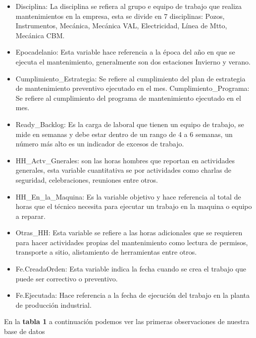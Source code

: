 \documentclass[
  11pt,
  bookmarksnumbered]{article}
\begin{document}
\begin{itemize}
\item
  Disciplina: La disciplina se refiera al grupo e equipo de trabajo que realiza mantenimientos en la empresa, esta se divide en 7 disciplinas: Pozos, Instrumentos, Mecánica, Mecánica VAL, Electricidad, Línea de Mtto, Mecánica CBM.
\item
  Epocadelanio: Esta variable hace referencia a la época del año en que se ejecuta el mantenimiento, generalmente son dos estaciones Invierno y verano.
\item
  Cumplimiento\_Estrategia: Se refiere al cumplimiento del plan de estrategia de mantenimiento preventivo ejecutado en el mes.
  Cumplimiento\_Programa: Se refiere al cumplimiento del programa de mantenimiento ejecutado en el mes.
\item
  Ready\_Backlog: Es la carga de laboral que tienen un equipo de trabajo, se mide en semanas y debe estar dentro de un rango de 4 a 6 semanas, un número más alto es un indicador de excesos de trabajo.
\item
  HH\_Actv\_Gnerales: son las horas hombres que reportan en actividades generales, esta variable cuantitativa se por actividades como charlas de seguridad, celebraciones, reuniones entre otros.
\item
  HH\_En\_la\_Maquina: Es la variable objetivo y hace referencia al total de horas que el técnico necesita para ejecutar un trabajo en la maquina o equipo a reparar.
\item
  Otras\_HH: Esta variable se refiere a las horas adicionales que se requieren para hacer actividades propias del mantenimiento como lectura de permisos, transporte a sitio, alistamiento de herramientas entre otros.
\item
  Fe.CreadaOrden: Esta variable indica la fecha cuando se crea el trabajo que puede ser correctivo o preventivo.
\item
  Fe.Ejecutada: Hace referencia a la fecha de ejecución del trabajo en la planta de producción industrial.
\end{itemize}

\vspace{0.2cm}

En la \textbf{tabla 1} a continuación podemos ver las primeras observaciones de nuestra base de datos
\end{document}
